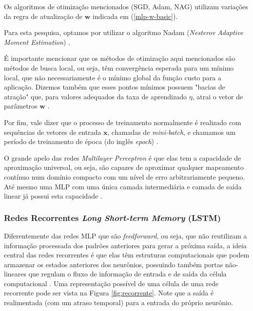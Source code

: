 \documentclass[a4paper, 12pt]{article}
\begin{document}
Os algoritmos de otimização mencionados (SGD, Adam, NAG) utilizam variações da regra de atualização de $\mathbf{w}$ indicada em (\ref{mlp-w-basic}).

Para esta pesquisa, optamos por utilizar o algoritmo Nadam (\textit{Nesterov Adaptive Moment Estimation}) \cite{dozat2016incorporating}.

É importante mencionar que os métodos de otimização aqui mencionados são métodos de busca local, ou seja, têm convergência esperada para um mínimo local, que não necessariamente é o mínimo global da função custo para a aplicação. Dizemos também que esses pontos mínimos possuem "bacias de atração" que, para valores adequados da taxa de aprendizado $\eta$, atrai o vetor de parâmetros $\mathbf{w}$ \cite{hastie2009elements}.

Por fim, vale dizer que o processo de treinamento normalmente é realizado com sequências de vetores de entrada $\mathbf{x}$, chamadas de \textit{mini-batch}, e chamamos um período de treinamento de época (do inglês \textit{epoch}) \cite{geron2019hands}.

O grande apelo das redes \textit{Multilayer Perceptron} é que elas tem a capacidade de aproximação universal, ou seja, são capazes de aproximar qualquer mapeamento contí\-nuo num domínio compacto com um nível de erro arbitrariamente pequeno. Até mesmo uma MLP com uma única camada intermediária e camada de saída linear já possui esta capacidade \cite{cybenko1989approximation}.

\subsubsection{Redes Recorrentes \textit{Long Short-term Memory} (LSTM)}
Diferentemente das redes MLP que são \textit{feedforward}, ou seja, que não reutilizam a informação processada dos padrões anteriores para gerar a próxima saída, a ideia central das redes recorrentes é que elas têm estruturas computacionais que podem armazenar os estados anteriores dos neurônios, possuindo também portas não-lineares que regulam o fluxo de informação de entrada e de saída da célula computacional \cite{haykin2010neural}. Uma representação possível de uma célula de uma rede recorrente pode ser vista na Figura \ref{fig:recorrente}. Note que a saída é realimentada (com um atraso temporal) para a entrada do próprio neurônio.
\end{document}

